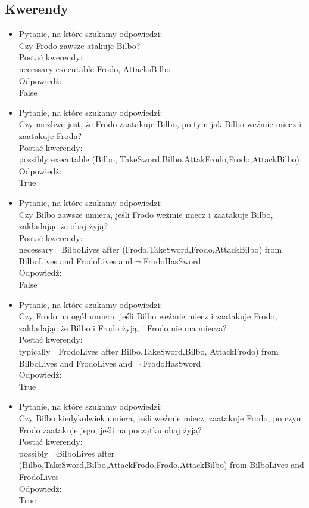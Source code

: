 \documentclass[11pt,a4paper]{article}
\begin{document}
\subsection{Kwerendy}
\begin{itemize}
\item Pytanie, na które szukamy odpowiedzi: \\
Czy Frodo zawsze atakuje Bilbo?\\
Postać kwerendy: \\
necessary executable {Frodo, AttacksBilbo} \\
Odpowiedź: \\
False \\

\item Pytanie, na które szukamy odpowiedzi: \\
Czy możliwe jest, że Frodo zaatakuje Bilbo, po tym jak Bilbo weźmie miecz i zaatakuje Froda?\\
Postać kwerendy: \\
possibly executable  ({Bilbo, TakeSword},{Bilbo,AttakFrodo},{Frodo,AttackBilbo})
Odpowiedź: \\
True\\

\item Pytanie, na które szukamy odpowiedzi: \\
Czy Bilbo zawsze umiera, jeśli Frodo weźmie miecz i zaatakuje Bilbo, zakładając że obaj żyją?\\
Postać kwerendy: \\
necessary $\neg$BilboLives after ({Frodo,TakeSword},{Frodo,AttackBilbo}) from BilboLives and FrodoLives  and $\neg$ FrodoHasSword \\
Odpowiedź: \\
False\\

\item Pytanie, na które szukamy odpowiedzi: \\
Czy Frodo na ogół umiera, jeśli Bilbo weźmie miecz i zaatakuje Frodo, zakładając że Bilbo i Frodo żyją, i Frodo nie ma miecza?\\
Postać kwerendy: \\
typically $\neg$FrodoLives after {Bilbo,TakeSword},{Bilbo, AttackFrodo}) from BilboLives and FrodoLives and $\neg$ FrodoHasSword \\
Odpowiedź: \\
True\\

\item Pytanie, na które szukamy odpowiedzi: \\
Czy Bilbo kiedykolwiek umiera, jeśli weźmie miecz, zaatakuje Frodo, po czym Frodo zaatakuje jego, jeśli na początku obaj żyją? \\
Postać kwerendy: \\
possibly $\neg$BilboLives
 after ({Bilbo,TakeSword},{Bilbo,AttackFrodo},{Frodo,AttackBilbo}) from BilboLives and FrodoLives \\
 Odpowiedź: \\
True


\end{itemize}
\end{document}

